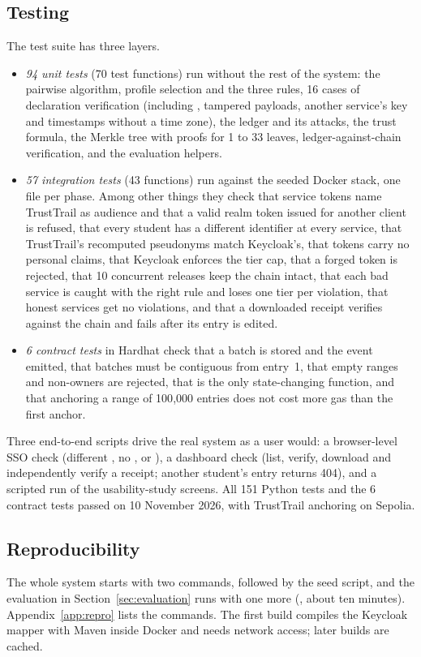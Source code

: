 \subsection{Testing}
The test suite has three layers.
\begin{itemize}
\item \emph{94 unit tests} (70 test functions) run without the rest of the system: the pairwise algorithm, profile selection and the three rules, 16 cases of declaration verification (including , tampered payloads, another service's key and timestamps without a time zone), the ledger and its attacks, the trust formula, the Merkle tree with proofs for 1 to 33 leaves, ledger-against-chain verification, and the evaluation helpers.
\item \emph{57 integration tests} (43 functions) run against the seeded Docker stack, one file per phase. Among other things they check that service tokens name TrustTrail as audience and that a valid realm token issued for another client is refused, that every student has a different identifier at every service, that TrustTrail's recomputed pseudonyms match Keycloak's, that tokens carry no personal claims, that Keycloak enforces the tier cap, that a forged token is rejected, that 10 concurrent releases keep the chain intact, that each bad service is caught with the right rule and loses one tier per violation, that honest services get no violations, and that a downloaded receipt verifies against the chain and fails after its entry is edited.
\item \emph{6 contract tests} in Hardhat check that a batch is stored and the event emitted, that batches must be contiguous from entry~1, that empty ranges and non-owners are rejected, that  is the only state-changing function, and that anchoring a range of 100{,}000 entries does not cost more gas than the first anchor.
\end{itemize}
Three end-to-end scripts drive the real system as a user would: a browser-level SSO check (different , no ,  or ), a dashboard check (list, verify, download and independently verify a receipt; another student's entry returns 404), and a scripted run of the usability-study screens. All 151 Python tests and the 6 contract tests passed on 10 November 2026, with TrustTrail anchoring on Sepolia.

\subsection{Reproducibility}
The whole system starts with two commands,  followed by the seed script, and the evaluation in Section~\ref{sec:evaluation} runs with one more (, about ten minutes). Appendix~\ref{app:repro} lists the commands. The first build compiles the Keycloak mapper with Maven inside Docker and needs network access; later builds are cached.
